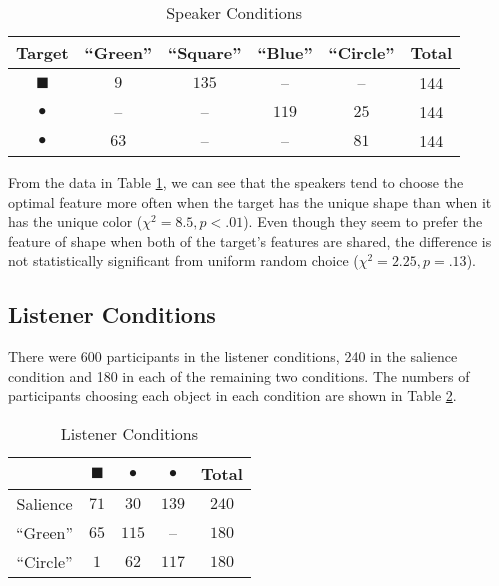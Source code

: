 \begin{table}[htb]   
  \caption{Speaker Conditions}
  \centering
  \begin{tabular}{c|ccccc}
   Target  & ``Green'' & ``Square'' & ``Blue'' & ``Circle'' & Total\\ 
     \hline
\textcolor{green!65}{\large{$\blacksquare$}}    & $9$        &   $135$   & -- & -- &144\\
\textcolor{blue!65}{\Huge{$\bullet$}}           & --        &   --      & $119$ & $25$ & 144\\
\textcolor{green!65}{\Huge{$\bullet$}}          & $63$        &   --    &  --   & $81$             &144
  \end{tabular}

  \label{table:speaker}
\end{table}

From the data in Table \ref{table:speaker}, we can see that the
speakers tend to choose the optimal feature more often when the target
has the unique shape than when it has the unique color ($\chi^2=8.5,
p<.01$). Even though they seem to prefer the feature of shape when
both of the target's features are shared, the difference is not
statistically significant from uniform random choice ($\chi^2=2.25,
p=.13$).


\subsection{Listener Conditions}

There were 600 participants in the listener conditions, 240 in the salience condition and 180 in each of the remaining two conditions. The numbers of participants choosing each object in each condition are shown in Table \ref{table:listener}. 

\begin{table}[htb] 
  \caption{Listener Conditions}
  \centering
\begin{tabular}{c|cccc}
   & \quad \textcolor{green!65}{\Large{$\blacksquare$}}&  \textcolor{green!65}{\Huge{$\bullet$}}& \textcolor{blue!65}{\Huge{$\bullet$}} & Total\\ 
     \hline
 Salience   \quad  & \quad  $71$      \quad    &   $30$    \quad     & $139$ \quad     & $240$      \\
 ``Green''   \quad  & \quad  $65$      \quad    &   $115$    \quad     & -- \quad     & $180$     \\
 ``Circle''   &  \quad $1$        &    $62$        & $117$ \quad     & $180$
  \end{tabular}

  \label{table:listener}
\end{table}

